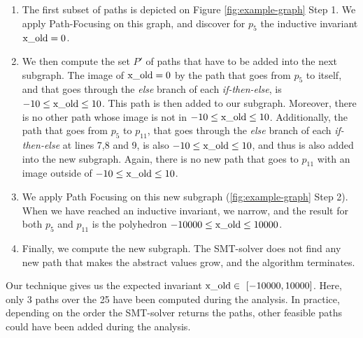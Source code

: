 \documentclass[preprint]{sigplanconf}
\begin{document}
\begin{enumerate}
	\item The first subset of paths is depicted on Figure
		\ref{fig:example-graph} Step 1. We apply Path-Focusing on this graph,
		and discover for $p_5$ the inductive invariant $\lstinline|x_old| = 0$.
	\item
		We then compute the set $P'$ of paths that have to be added into the
		next subgraph. 
		The image of $\lstinline|x_old| = 0$ by the path that goes from $p_5$ to
		itself, and that goes through the \emph{else} branch of each 
		\emph{if-then-else}, is $-10 \leq \lstinline|x_old| \leq 10$. This path
		is then added to our subgraph. Moreover, there is no other path whose
		image is not in $-10 \leq \lstinline|x_old| \leq 10$.
		Additionally, the path that goes from $p_5$ to
		$p_11$, that goes through the \emph{else} branch of each 
		\emph{if-then-else} at lines 7,8 and 9, is also 
		$-10 \leq \lstinline|x_old| \leq 10$, and thus is also added into the
		new subgraph. Again, there is no new path that goes to $p_11$ with an
		image outside of $-10 \leq \lstinline|x_old| \leq 10$.
	\item
		We apply Path Focusing on this new subgraph (\ref{fig:example-graph}
		Step 2). When we have reached an inductive invariant, we narrow, and the
		result for both $p_5$ and $p_11$ is the polyhedron 
		$-10000 \leq \lstinline|x_old| \leq 10000$.
	\item Finally, we compute the new subgraph. The SMT-solver does not find any
		new path that makes the abstract values grow, and the algorithm
		terminates.
\end{enumerate}

Our technique gives us the expected invariant 
$\lstinline|x_old| \in~[-10000,\allowbreak 10000]$. 
Here, only 3 paths over the 25 have been computed during the analysis. In
practice, depending on the order the SMT-solver returns the paths, other
feasible paths could have been added during the analysis.
\end{document}
